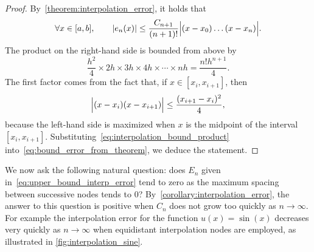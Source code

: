 \begin{proof}
By~\cref{theorem:interpolation_error},
it holds that
\begin{equation}
    \label{eq:bound_error_from_theorem}
    \forall x \in [a, b], \qquad
    \lvert e_n(x)\rvert \leq \frac{C_{n+1}}{(n+1)!} \Bigl\lvert (x-x_0) \dotsc (x-x_n) \Bigr\rvert.
\end{equation}
The product on the right-hand side is bounded from above by
\begin{equation}
    \label{eq:interpolation_bound_product}
    \frac{h^2}{4} \times 2h \times 3h \times 4h \times \dotsb \times nh = \frac{n! h^{n+1}}{4}.
\end{equation}
The first factor comes from the fact that, if $x \in [x_i, x_{i+1}]$,
then
\[
    \Bigl\lvert (x - x_i)(x - x_{i+1}) \Bigr\rvert \leq \frac{(x_{i+1} - x_i)^2}{4},
\]
because the left-hand side is maximized when $x$ is the midpoint of the interval~$[x_i, x_{i+1}]$.
Substituting~\eqref{eq:interpolation_bound_product} into~\eqref{eq:bound_error_from_theorem},
we deduce the statement.
\end{proof}
We now ask the following natural question:
does $E_n$ given in~\eqref{eq:upper_bound_interp_error} tend to zero as the maximum spacing between successive nodes tends to 0?
By~\cref{corollary:interpolation_error},
the answer to this question is positive when $C_{n}$ does not grow too quickly as $n \to \infty$.
For example
the interpolation error for the function $u(x) = \sin(x)$
decreases very quickly as $n \to \infty$
when equidistant interpolation nodes are employed,
as illustrated in \cref{fig:interpolation_sine}.

